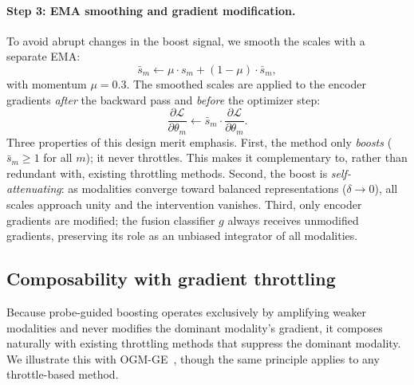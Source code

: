 \documentclass{article}
\newcommand{\loss}{\mathcal{L}}
\begin{document}
\paragraph{Step 3: EMA smoothing and gradient modification.}
To avoid abrupt changes in the boost signal, we smooth the scales with a separate EMA:
%
\begin{equation}
\label{eq:ema_scale}
\bar{s}_m \leftarrow \mu \cdot s_m + (1 - \mu) \cdot \bar{s}_m,
\end{equation}
%
with momentum $\mu = 0.3$. The smoothed scales are applied to the encoder gradients \emph{after} the backward pass and \emph{before} the optimizer step:
%
\begin{equation}
\label{eq:gradient_mod}
\frac{\partial \loss}{\partial \theta_m} \leftarrow \bar{s}_m \cdot \frac{\partial \loss}{\partial \theta_m}.
\end{equation}
%
Three properties of this design merit emphasis. First, the method only \emph{boosts} ($\bar{s}_m \geq 1$ for all $m$); it never throttles. This makes it complementary to, rather than redundant with, existing throttling methods. Second, the boost is \emph{self-attenuating}: as modalities converge toward balanced representations ($\delta \to 0$), all scales approach unity and the intervention vanishes. Third, only encoder gradients are modified; the fusion classifier $g$ always receives unmodified gradients, preserving its role as an unbiased integrator of all modalities.


\subsection{Composability with gradient throttling}
\label{sec:compose}

Because probe-guided boosting operates exclusively by amplifying weaker modalities and never modifies the dominant modality's gradient, it composes naturally with existing throttling methods that suppress the dominant modality. We illustrate this with OGM-GE~\citep{peng2022ogmge}, though the same principle applies to any throttle-based method.
\end{document}

